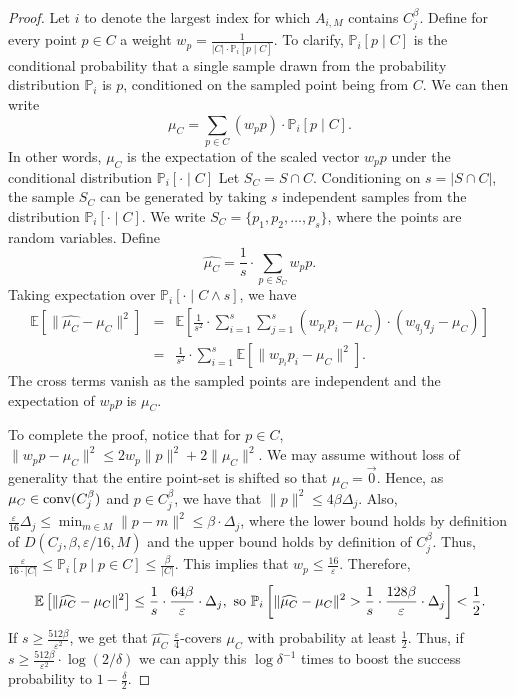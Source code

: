 \documentclass[11pt]{article}
\begin{document}
\begin{proof}
    Let $i$ to denote the largest index for which $A_{i,M}$ contains $C_j^\beta$.
    Define for every point $p\in C$ a weight $w_p = \frac{1}{|C|\cdot\mathbb{P}_i[p\mid C]}$. To clarify, $\mathbb{P}_i[p\mid C]$ 
    is the conditional probability that a single sample drawn from the probability distribution $\mathbb{P}_i$ is $p$, 
    conditioned on the sampled point being from $C$. We can then write
    $$
    \mu_C = \sum_{p\in C} (w_pp)\cdot\mathbb{P}_i[p\mid C].
    $$
    In other words, $\mu_C$ is the expectation of the scaled vector $w_pp$ under the conditional distribution $\mathbb{P}_i[\cdot\mid C]$
    Let $S_C = S\cap C$. Conditioning on $s = |S\cap C|$, the sample $S_C$ can be generated by taking $s$ independent samples from
    the distribution $\mathbb{P}_i[\cdot\mid C]$. We write $S_C = \{p_1,p_2,\dots,p_s\}$, where the points are random variables. Define
    $$
    \widehat{\mu_C} = \frac{1}{s}\cdot\sum_{p\in S_C} w_pp.
    $$
    Taking expectation over $\mathbb{P}_i[\cdot\mid C\wedge s]$, we have
    \begin{eqnarray*}
        {\mathbb E}\left[\|\widehat{\mu_C} - \mu_C\|^2\right] & = &
        {\mathbb E}\left[\frac{1}{s^2}\cdot\sum_{i=1}^s\sum_{j=1}^s (w_{p_i}p_i - \mu_C)\cdot (w_{q_j}q_j - \mu_C)\right] \\
        & = & \frac{1}{s^2}\cdot\sum_{i=1}^s {\mathbb E}\left[\|w_{p_i}p_i - \mu_C\|^2\right].
    \end{eqnarray*}
The cross terms vanish as the sampled points are independent and the expectation of $w_p p$ is $\mu_C$.

To complete the proof, notice that for $p\in C$, $\|w_{p}p - \mu_C\|^2\le 2w_p\|p\|^2 + 2\|\mu_C\|^2$. We may
assume without loss of generality that the entire point-set is shifted so that $\mu_C = \vec{0}$. Hence, as
$\mu_C\in \hbox{conv}(C_j^\beta)$ and $p\in C_j^\beta$, we have that $\|p\|^2\le 4\beta\Delta_j$. Also, 
$\frac{\varepsilon}{16}\Delta_j\leq \min_{m\in M} \|p-m\|^2 \leq \beta \cdot \Delta_j$, 
where the lower bound holds by definition of $D(C_j,\beta,\varepsilon/16,M)$ and the upper bound holds by 
definition of $C_j^\beta$. Thus, $\frac{\varepsilon}{16\cdot |C|}\leq \mathbb{P}_i[p\mid p\in C] \leq \frac{\beta}{|C|}$.
This implies that $w_p\le \frac{16}{\varepsilon}$. Therefore,
$$
{\mathbb E}\left[\|\widehat{\mu_C} - \mu_C\|^2\right] \le \frac{1}{s}\cdot\frac{64\beta}{\varepsilon}\cdot\Delta_j,
\hbox{ so  } \mathbb{P}_i\left[\|\widehat{\mu_C} - \mu_C\|^2 > \frac{1}{s}\cdot\frac{128\beta}{\varepsilon}\cdot\Delta_j\right] < \frac 1 2.
$$
If $s\ge \frac{512\beta}{\varepsilon^2}$, we get that $\widehat{\mu_C}$ $\frac{\varepsilon}{4}$-covers $\mu_C$ with probability
at least $\frac 1 2$. Thus, if $s\ge \frac{512\beta}{\varepsilon^2}\cdot\log(2/\delta)$ we can apply this $\log\delta^{-1}$
times to boost the success probability to $1-\frac{\delta}{2}$.


\end{proof}
\end{document}
